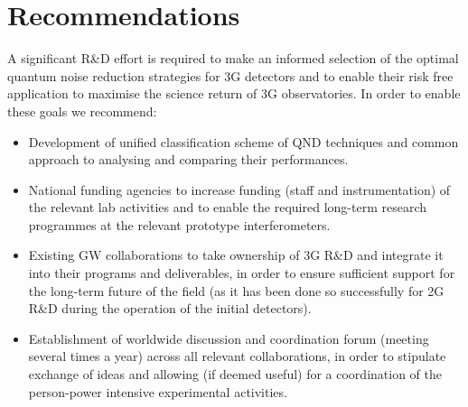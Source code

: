 \section{Recommendations}
A significant R\&D effort is required to make an informed selection of the optimal quantum noise reduction strategies for 3G detectors and to enable their risk free application to maximise the science return of 3G observatories. In order to enable these goals we recommend:
\begin{itemize}
\item Development of unified classification scheme of QND techniques and common approach to analysing and comparing their performances.  
\item National funding agencies to increase funding (staff and instrumentation) of the relevant lab activities and to enable the required long-term research programmes at the relevant prototype interferometers.
\item Existing GW collaborations to take ownership of 3G R\&D and integrate it into their programs and deliverables, in order to ensure sufficient support for the long-term future of the field (as it has been done so successfully for 2G R\&D during the operation of the initial detectors). 
\item Establishment of worldwide discussion and coordination forum (meeting several times a year) across all relevant collaborations, in order to stipulate exchange of ideas and allowing (if deemed useful) for a coordination of the person-power intensive experimental activities.
\end{itemize}



